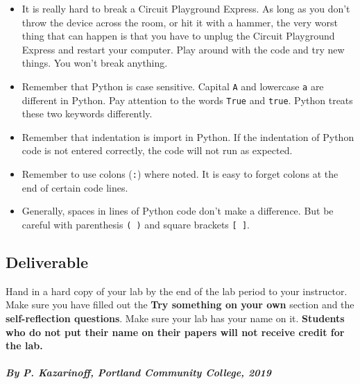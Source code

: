 \documentclass[11pt]{article}
\begin{document}
\begin{itemize}
\item
  It is really hard to break a Circuit Playground Express. As long as
  you don't throw the device across the room, or hit it with a hammer,
  the very worst thing that can happen is that you have to unplug the
  Circuit Playground Express and restart your computer. Play around with
  the code and try new things. You won't break anything.
\item
  Remember that Python is case sensitive. Capital \texttt{A} and
  lowercase \texttt{a} are different in Python. Pay attention to the
  words \texttt{True} and \texttt{true}. Python treats these two
  keywords differently.
\item
  Remember that indentation is import in Python. If the indentation of
  Python code is not entered correctly, the code will not run as
  expected.
\item
  Remember to use colons (\texttt{:}) where noted. It is easy to forget
  colons at the end of certain code lines.
\item
  Generally, spaces in lines of Python code don't make a difference. But
  be careful with parenthesis \texttt{(\ )} and square brackets
  \texttt{{[}\ {]}}.
\end{itemize}

    \hypertarget{deliverable}{%
\subsection{Deliverable}\label{deliverable}}

Hand in a hard copy of your lab by the end of the lab period to your
instructor. Make sure you have filled out the \textbf{Try something on
your own} section and the \textbf{self-reflection questions}. Make sure
your lab has your name on it. \textbf{Students who do not put their name
on their papers will not receive credit for the lab.}

    \hypertarget{by-p.-kazarinoff-portland-community-college-2019}{%
\paragraph{\texorpdfstring{\emph{By P. Kazarinoff, Portland Community
College,
2019}}{By P. Kazarinoff, Portland Community College, 2019}}\label{by-p.-kazarinoff-portland-community-college-2019}}


    
    
    
    
\end{document}
